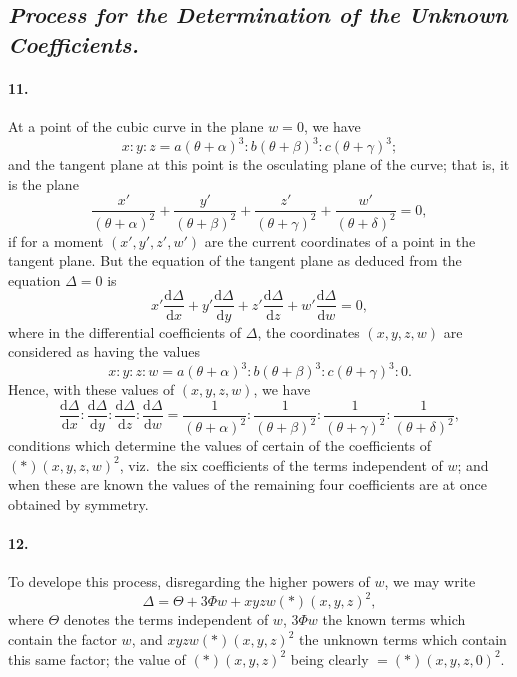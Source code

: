 \documentclass[11pt,a4paper]{article}
\providecommand{\dd}{\mathrm{d}}
\begin{document}
\subsection*{\textit{Process for the Determination of the Unknown Coefficients.}}

\paragraph{11.}
At a point of the cubic curve in the plane $w = 0$, we have
\[
x : y : z = a(\theta + \alpha)^3 : b(\theta + \beta)^3 : c(\theta + \gamma)^3;
\]
and the tangent plane at this point is the osculating plane of the curve; that is, it
is the plane
\[
\frac{x'}{(\theta + \alpha)^2} + \frac{y'}{(\theta + \beta)^2}
+ \frac{z'}{(\theta + \gamma)^2} + \frac{w'}{(\theta + \delta)^2} = 0,
\]
if for a moment $(x', y', z', w')$ are the current coordinates of a point in the tangent
plane. But the equation of the tangent plane as deduced from the equation $\Delta = 0$ is
\[
x' \frac{\dd \Delta}{\dd x} + y' \frac{\dd \Delta}{\dd y}
+ z' \frac{\dd \Delta}{\dd z} + w' \frac{\dd \Delta}{\dd w} = 0,
\]
where in the differential coefficients of $\Delta$, the coordinates $(x, y, z, w)$ are
considered as having the values
\[
x : y : z : w = a(\theta + \alpha)^3 : b(\theta + \beta)^3 : c(\theta + \gamma)^3 : 0.
\]
Hence, with these values of $(x, y, z, w)$, we have
\[
\frac{\dd \Delta}{\dd x} : \frac{\dd \Delta}{\dd y}
 : \frac{\dd \Delta}{\dd z} : \frac{\dd \Delta}{\dd w}
 = \frac{1}{(\theta + \alpha)^2} : \frac{1}{(\theta + \beta)^2}
 : \frac{1}{(\theta + \gamma)^2} : \frac{1}{(\theta + \delta)^2},
\]
conditions which determine the values of certain of the coefficients of $(*)(x, y, z, w)^2$,
viz.\ the six coefficients of the terms independent of $w$; and when these are known the
values of the remaining four coefficients are at once obtained by symmetry.

\paragraph{12.}
To develope this process, disregarding the higher powers of $w$, we may write
\[
\Delta = \Theta + 3 \Phi w + xyzw (*)(x, y, z)^2,
\]
where $\Theta$ denotes the terms independent of $w$, $3\Phi w$ the known terms which
contain the factor $w$, and $xyzw (*)(x, y, z)^2$ the unknown terms which contain this
same factor; the value of $(*)(x, y, z)^2$ being clearly $= (*)(x, y, z, 0)^2$.
\end{document}
